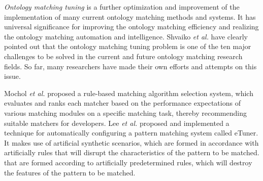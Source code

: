 \documentclass[twoside]{article}
\makeatletter
\def\subsection{\@startsection{subsection}{2}{\z@}%
 {-3ex\@plus -.2ex \@minus -.2ex}%
 {2ex \@plus.2ex}%
{\normalfont\normalsize\protect\baselineskip=12.5pt plus.2pt minus.2pt\bfseries}}
\makeatother
\begin{document}
\begin{multicols}{2}
{\it Ontology matching tuning} is a further optimization and improvement of the implementation of many current ontology matching methods and systems. 
It has universal significance for improving the ontology matching efficiency and realizing the ontology matching automation and intelligence.
Shvaiko {\it et al.} have clearly pointed out that the ontology matching tuning problem is one of the ten major challenges to be solved in the current and future ontology matching research fields\cite{wwy18,wwy35}. 
So far, many researchers have made their own efforts and attempts on this issue.

Mochol {\it et al.} proposed a rule-based matching algorithm selection system\cite{wwy36}, which evaluates and ranks each matcher based on the performance expectations of various matching modules on a specific matching task, thereby recommending suitable matchers for developers. 
Lee {\it et al.} proposed and implemented a technique for automatically configuring a pattern matching system called eTuner\cite{wwy38}. It makes use of artificial synthetic scenarios, which are formed in accordance with artificially rules that will disrupt the characteristics of the pattern to be matched.
 that are formed according to artificially predetermined rules, which will destroy the features of the pattern to be matched.


\end{multicols}
\end{document}
